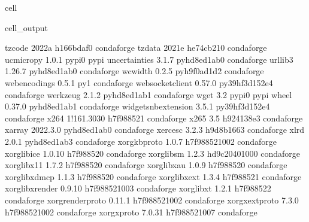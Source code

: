 \documentclass[letterpaper,table,10pt,english]{jupyterBook}
\begin{document}
\begin{sphinxuseclass}{cell}
\begin{sphinxVerbatimOutput}
\begin{sphinxuseclass}{cell_output}
\begin{sphinxVerbatim}[commandchars=\\\{\}]
tzcode                    2022a                h166bdaf\PYGZus{}0    conda\PYGZhy{}forge
tzdata                    2021e                he74cb21\PYGZus{}0    conda\PYGZhy{}forge
uc\PYGZhy{}micro\PYGZhy{}py               1.0.1                    pypi\PYGZus{}0    pypi
uncertainties             3.1.7              pyhd8ed1ab\PYGZus{}0    conda\PYGZhy{}forge
urllib3                   1.26.7             pyhd8ed1ab\PYGZus{}0    conda\PYGZhy{}forge
wcwidth                   0.2.5              pyh9f0ad1d\PYGZus{}2    conda\PYGZhy{}forge
webencodings              0.5.1                      py\PYGZus{}1    conda\PYGZhy{}forge
websocket\PYGZhy{}client          0.57.0           py39hf3d152e\PYGZus{}4    conda\PYGZhy{}forge
werkzeug                  2.1.2              pyhd8ed1ab\PYGZus{}1    conda\PYGZhy{}forge
wget                      3.2                      pypi\PYGZus{}0    pypi
wheel                     0.37.0             pyhd8ed1ab\PYGZus{}1    conda\PYGZhy{}forge
widgetsnbextension        3.5.1            py39hf3d152e\PYGZus{}4    conda\PYGZhy{}forge
x264                      1!161.3030           h7f98852\PYGZus{}1    conda\PYGZhy{}forge
x265                      3.5                  h924138e\PYGZus{}3    conda\PYGZhy{}forge
xarray                    2022.3.0           pyhd8ed1ab\PYGZus{}0    conda\PYGZhy{}forge
xerces\PYGZhy{}c                  3.2.3                h9d8b166\PYGZus{}3    conda\PYGZhy{}forge
xlrd                      2.0.1              pyhd8ed1ab\PYGZus{}3    conda\PYGZhy{}forge
xorg\PYGZhy{}kbproto              1.0.7             h7f98852\PYGZus{}1002    conda\PYGZhy{}forge
xorg\PYGZhy{}libice               1.0.10               h7f98852\PYGZus{}0    conda\PYGZhy{}forge
xorg\PYGZhy{}libsm                1.2.3             hd9c2040\PYGZus{}1000    conda\PYGZhy{}forge
xorg\PYGZhy{}libx11               1.7.2                h7f98852\PYGZus{}0    conda\PYGZhy{}forge
xorg\PYGZhy{}libxau               1.0.9                h7f98852\PYGZus{}0    conda\PYGZhy{}forge
xorg\PYGZhy{}libxdmcp             1.1.3                h7f98852\PYGZus{}0    conda\PYGZhy{}forge
xorg\PYGZhy{}libxext              1.3.4                h7f98852\PYGZus{}1    conda\PYGZhy{}forge
xorg\PYGZhy{}libxrender           0.9.10            h7f98852\PYGZus{}1003    conda\PYGZhy{}forge
xorg\PYGZhy{}libxt                1.2.1                h7f98852\PYGZus{}2    conda\PYGZhy{}forge
xorg\PYGZhy{}renderproto          0.11.1            h7f98852\PYGZus{}1002    conda\PYGZhy{}forge
xorg\PYGZhy{}xextproto            7.3.0             h7f98852\PYGZus{}1002    conda\PYGZhy{}forge
xorg\PYGZhy{}xproto               7.0.31            h7f98852\PYGZus{}1007    conda\PYGZhy{}forge

\end{sphinxVerbatim}
\end{sphinxuseclass}
\end{sphinxVerbatimOutput}
\end{sphinxuseclass}
\end{document}
